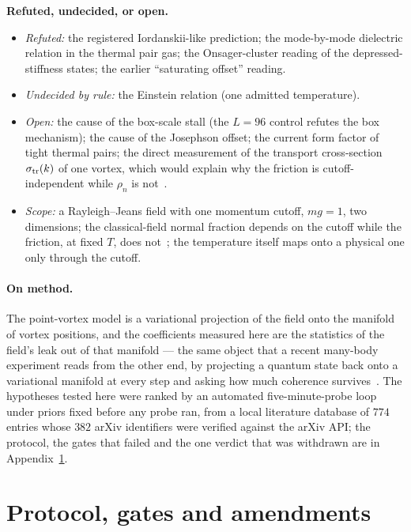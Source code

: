 \documentclass[11pt,a4paper]{article}
\begin{document}
\begin{failbox}
\textbf{Refuted, undecided, or open.}
\begin{itemize}[leftmargin=*]
\item \emph{Refuted:} the registered Iordanskii-like prediction; the mode-by-mode dielectric relation in the thermal pair
  gas; the Onsager-cluster reading of the depressed-stiffness states; the earlier ``saturating offset'' reading.
\item \emph{Undecided by rule:} the Einstein relation (one admitted temperature).
\item \emph{Open:} the cause of the box-scale stall (the $L=96$ control refutes the box mechanism); the cause of the Josephson offset; the current
  form factor of tight thermal pairs; the direct measurement of the transport cross-section $\sigma_{\rm tr}(k)$ of one vortex, which would explain why the friction is cutoff-independent while $\rho_n$ is not~\cite{Callens2026b}.
\item \emph{Scope:} a Rayleigh--Jeans field with one momentum cutoff, $mg=1$, two dimensions; the classical-field normal
  fraction depends on the cutoff while the friction, at fixed $T$, does not~\cite{Callens2026b}; the temperature itself maps onto a physical one only through the cutoff.
\end{itemize}
\end{failbox}

\paragraph{On method.} The point-vortex model is a variational projection of the field onto the manifold of vortex
positions, and the coefficients measured here are the statistics of the field's leak out of that manifold --- the
same object that a recent many-body experiment reads from the other end, by projecting a quantum state back onto a
variational manifold at every step and asking how much coherence survives~\cite{Dong2026}. The hypotheses tested here
were ranked by an automated five-minute-probe loop under priors fixed before any probe ran, from a local literature
database of $774$ entries whose $382$ arXiv identifiers were verified against the arXiv API; the protocol, the gates
that failed and the one verdict that was withdrawn are in Appendix~\ref{app:protocol}.

\appendix

\section{Protocol, gates and amendments}\label{app:protocol}
\end{document}
